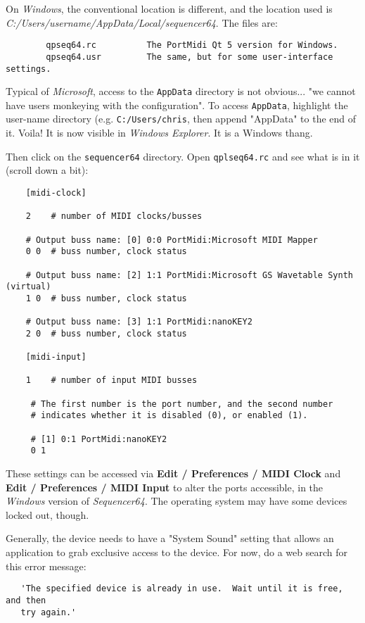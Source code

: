     On \textsl{Windows},
    the conventional location is different, and the location used
    is \textsl{C:/Users/username/AppData/Local/sequencer64}.
    The files are:

\begin{verbatim}
        qpseq64.rc          The PortMidi Qt 5 version for Windows.
        qpseq64.usr         The same, but for some user-interface settings.
\end{verbatim}

    Typical of \textsl{Microsoft}, access to the \texttt{AppData} directory
    is not obvious... "we cannot have users monkeying with the configuration".
    To access \texttt{AppData}, highlight the user-name directory
    (e.g. \texttt{C:/Users/chris}, then append
    "AppData" to the end of it.  Voila! It is now visible in
    \textsl{Windows Explorer}.
    It is a Windows thang.

    Then click on the \texttt{sequencer64} directory.
    Open \texttt{qplseq64.rc} and see what is in it (scroll down a bit):

\begin{verbatim}
    [midi-clock]

    2    # number of MIDI clocks/busses

    # Output buss name: [0] 0:0 PortMidi:Microsoft MIDI Mapper
    0 0  # buss number, clock status

    # Output buss name: [2] 1:1 PortMidi:Microsoft GS Wavetable Synth (virtual)
    1 0  # buss number, clock status

    # Output buss name: [3] 1:1 PortMidi:nanoKEY2
    2 0  # buss number, clock status
    
    [midi-input]
    
    1    # number of input MIDI busses

	 # The first number is the port number, and the second number
	 # indicates whether it is disabled (0), or enabled (1).

	 # [1] 0:1 PortMidi:nanoKEY2
	 0 1
\end{verbatim}

   These settings can be accessed via
   \textbf{Edit / Preferences / MIDI Clock} and
   \textbf{Edit / Preferences / MIDI Input} to
	alter the ports accessible, in the \textsl{Windows}
   version of \textsl{Sequencer64}.
   The operating system may have some devices locked out, though.

   Generally, the device needs to have a "System Sound" setting that allows an
   application to grab exclusive access to the device.
   For now, do a web search for this error message:

\begin{verbatim}
   'The specified device is already in use.  Wait until it is free, and then
   try again.'
\end{verbatim}


